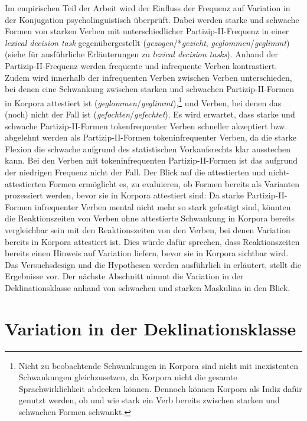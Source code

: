 Im empirischen Teil der Arbeit wird der Einfluss der Frequenz auf Variation in der Konjugation psycholinguistisch überprüft. Dabei werden starke und schwache Formen von starken Verben mit unterschiedlicher Partizip-II-Frequenz in einer \textit{lexical decision task} gegenübergestellt (\textit{gezogen}/*\textit{gezieht}, \textit{geglommen}/\textit{ge\-glimmt}) (siehe  für ausführliche Erläuterungen zu \textit{lexical decision tasks}). Anhand der Partizip-II-Frequenz werden frequente und infrequente Verben kontrastiert. Zudem wird innerhalb der infrequenten Verben zwischen Verben unterschieden, bei denen eine Schwankung zwischen starken und schwachen Partizip-II-Formen in Korpora attestiert ist (\textit{geglommen}/\textit{geglimmt}),\footnote{Nicht zu beobachtende Schwankungen in Korpora sind nicht mit inexistenten Schwankungen gleichzusetzen, da Korpora nicht die gesamte Sprachwirklichkeit abdecken können. Dennoch können Korpora als Indiz dafür genutzt werden, ob und wie stark ein Verb bereits zwischen starken und schwachen Formen schwankt.} und Verben, bei denen das (noch) nicht der Fall ist (\textit{gefochten}/\textit{gefechtet}). Es wird erwartet, dass starke und schwache Partizip-II-Formen tokenfrequenter Verben schneller akzeptiert bzw. abgelehnt werden als Partizip-II-Formen tokeninfrequenter Verben, da die starke Flexion die schwache aufgrund des statistischen Vorkaufsrechts klar ausstechen kann. Bei den Verben mit tokeninfrequenten Par\-ti\-zip-II-Formen ist das aufgrund der niedrigen Frequenz nicht der Fall. Der Blick auf die attestierten und nicht-attestierten Formen ermöglicht es, zu evaluieren, ob Formen bereits als Varianten prozessiert werden, bevor sie in Korpora at\-tes\-tiert sind: Da starke Partizip-II-Formen infrequenter Verben mental nicht mehr so stark gefestigt sind, könnten die Reaktionszeiten von Verben ohne attestierte Schwankung in Korpora bereits vergleichbar sein mit den Reaktionszeiten von den Verben, bei denen Variation bereits in Korpora attestiert ist. Dies würde dafür sprechen, dass Reaktionszeiten bereits einen Hinweis auf Variation liefern, bevor sie in Korpora sichtbar wird. Das Versuchsdesign und die Hypothesen werden ausführlich in  erläutert,  stellt die Ergebnisse vor.
Der nächste Abschnitt nimmt die Variation in der Deklinationsklasse anhand von schwachen und starken Maskulina in den Blick.

\section{Variation in der Deklinationsklasse}\label{deklination}

